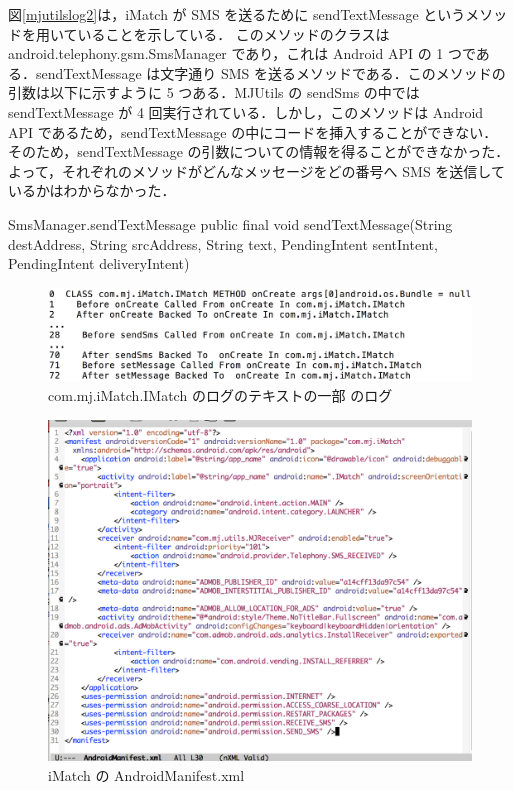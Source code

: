 図\ref{mjutilslog2}は，iMatch が SMS を送るために sendTextMessage というメソッドを用いていることを示している．
このメソッドのクラスは android.telephony.gsm.SmsManager であり，これは Android API の 1 つである\cite{smsmanager}．sendTextMessage は文字通り SMS を送るメソッドである．このメソッドの引数は以下に示すように 5 つある．MJUtils の sendSms の中では sendTextMessage が 4 回実行されている．しかし，このメソッドは Android API であるため，sendTextMessage の中にコードを挿入することができない．
そのため，sendTextMessage の引数についての情報を得ることができなかった．
よって，それぞれのメソッドがどんなメッセージをどの番号へ SMS を送信しているかはわからなかった．

\begin{itembox}[c]{SmsManager.sendTextMessage}
public final void sendTextMessage(String destAddress, String srcAddress, String text, PendingIntent sentIntent, PendingIntent deliveryIntent)
\end{itembox}

\begin{figure}[t]
\begin{center}
\graphicspath{{./epsfiles/}}
\includegraphics[scale=0.2]{logtext1.eps}
\end{center}
\caption{com.mj.iMatch.IMatch のログのテキストの一部 のログ}
\label{imatchlog}
\end{figure}


\begin{figure}[t]
\begin{center}
\graphicspath{{./epsfiles/}}
\includegraphics[scale=0.2]{imatchmanifest.eps}
\end{center}
\caption{iMatch の AndroidManifest.xml}
\label{imatchmanif}
\end{figure}

